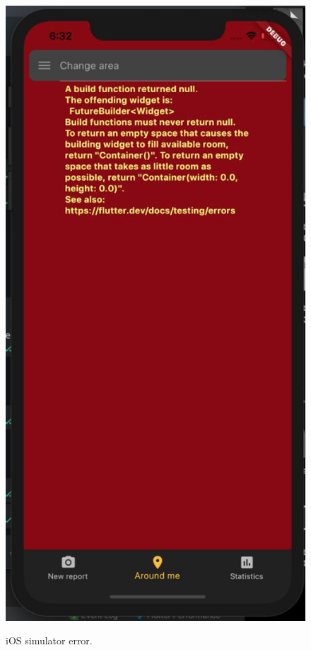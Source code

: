 \documentclass[../ATD.tex]{subfiles}
\begin{document}
    \begin{figure}[H]
        \centering
        \includegraphics[scale = 0.4]{assets/iOS_simulator_error.png}\\
        \caption[iOS simulator error]{iOS simulator error.}
    \end{figure}
\end{document}
